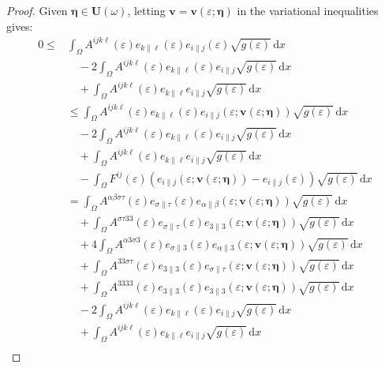 \documentclass{amsart}
\def\dd{\, \mathrm{d}}
\begin{document}
\begin{proof}
Given $\bm{\eta} \in \bm{U}(\omega)$, letting $\bm{v}=\bm{v}(\varepsilon;\bm{\eta})$ in the variational inequalities gives:
\begin{equation}
	\label{varineq3}
	\begin{aligned}
		0\le&\int_{\Omega}A^{ijk\ell}(\varepsilon) e_{k\|\ell}(\varepsilon)e_{i\|j}(\varepsilon) \sqrt{g(\varepsilon)} \dd x\\
		&\quad-2\int_{\Omega}A^{ijk\ell}(\varepsilon) e_{k\|\ell}(\varepsilon) e_{i\|j} \sqrt{g(\varepsilon)} \dd x\\
		&\quad+\int_{\Omega} A^{ijk\ell}(\varepsilon) e_{k\|\ell} e_{i\|j} \sqrt{g(\varepsilon)} \dd x\\
		&\le \int_{\Omega}A^{ijk\ell}(\varepsilon) e_{k\|\ell}(\varepsilon)e_{i\|j}(\varepsilon;\bm{v}(\varepsilon;\bm{\eta})) \sqrt{g(\varepsilon)} \dd x\\
	&\quad-2\int_{\Omega}A^{ijk\ell}(\varepsilon) e_{k\|\ell}(\varepsilon) e_{i\|j} \sqrt{g(\varepsilon)} \dd x\\
	&\quad+\int_{\Omega} A^{ijk\ell}(\varepsilon) e_{k\|\ell} e_{i\|j} \sqrt{g(\varepsilon)} \dd x\\
	&\quad-\int_{\Omega} F^{ij}(\varepsilon) \left(e_{i\|j}(\varepsilon;\bm{v}(\varepsilon;\bm{\eta}))-e_{i\|j}(\varepsilon)\right) \sqrt{g(\varepsilon)} \dd x\\
	&=\int_{\Omega}A^{\alpha\beta\sigma\tau}(\varepsilon) e_{\sigma\|\tau}(\varepsilon)e_{\alpha\|\beta}(\varepsilon;\bm{v}(\varepsilon;\bm{\eta})) \sqrt{g(\varepsilon)} \dd x\\
	&\quad+\int_{\Omega}A^{\sigma\tau33}(\varepsilon) e_{\sigma\|\tau}(\varepsilon)e_{3\|3}(\varepsilon;\bm{v}(\varepsilon;\bm{\eta})) \sqrt{g(\varepsilon)}\dd x\\
	&\quad+4\int_{\Omega}A^{\alpha3\sigma3}(\varepsilon) e_{\sigma\|3}(\varepsilon)e_{\alpha\|3}(\varepsilon;\bm{v}(\varepsilon;\bm{\eta})) \sqrt{g(\varepsilon)} \dd x\\
	&\quad+\int_{\Omega}A^{33\sigma\tau}(\varepsilon) e_{3\|3}(\varepsilon)e_{\sigma\|\tau}(\varepsilon;\bm{v}(\varepsilon;\bm{\eta})) \sqrt{g(\varepsilon)} \dd x\\
	&\quad+\int_{\Omega}A^{3333}(\varepsilon) e_{3\|3}(\varepsilon)e_{3\|3}(\varepsilon;\bm{v}(\varepsilon;\bm{\eta})) \sqrt{g(\varepsilon)} \dd x\\
	&\quad-2\int_{\Omega}A^{ijk\ell}(\varepsilon) e_{k\|\ell}(\varepsilon) e_{i\|j} \sqrt{g(\varepsilon)} \dd x\\
	&\quad+\int_{\Omega} A^{ijk\ell}(\varepsilon) e_{k\|\ell} e_{i\|j} \sqrt{g(\varepsilon)} \dd x\\

\end{aligned}
\end{equation}
\end{proof}
\end{document}
